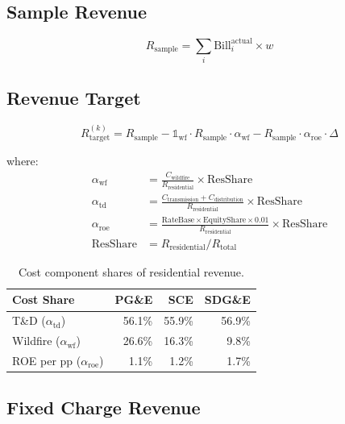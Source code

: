 \documentclass[9pt]{article}
\begin{document}
\subsection{Sample Revenue}

\begin{equation}
R_{\text{sample}} = \sum_i \text{Bill}_i^{\text{actual}} \times w
\end{equation}

\subsection{Revenue Target}

\begin{equation}
R_{\text{target}}^{(k)} = R_{\text{sample}} - \mathbb{1}_{\text{wf}} \cdot R_{\text{sample}} \cdot \alpha_{\text{wf}} - R_{\text{sample}} \cdot \alpha_{\text{roe}} \cdot \Delta
\end{equation}

where:
\begin{align}
\alpha_{\text{wf}} &= \frac{C_{\text{wildfire}}}{R_{\text{residential}}} \times \text{ResShare} \\
\alpha_{\text{td}} &= \frac{C_{\text{transmission}} + C_{\text{distribution}}}{R_{\text{residential}}} \times \text{ResShare} \\
\alpha_{\text{roe}} &= \frac{\text{RateBase} \times \text{EquityShare} \times 0.01}{R_{\text{residential}}} \times \text{ResShare} \\
\text{ResShare} &= R_{\text{residential}} / R_{\text{total}}
\end{align}

\begin{table}[htbp]
\centering
\caption{Cost component shares of residential revenue.}
\begin{tabular}{l r r r}
\toprule
\textbf{Cost Share} & \textbf{PG\&E} & \textbf{SCE} & \textbf{SDG\&E} \\
\midrule
T\&D ($\alpha_{\text{td}}$) & 56.1\% & 55.9\% & 56.9\% \\
Wildfire ($\alpha_{\text{wf}}$) & 26.6\% & 16.3\% & 9.8\% \\
ROE per pp ($\alpha_{\text{roe}}$) & 1.1\% & 1.2\% & 1.7\% \\
\bottomrule
\end{tabular}
\end{table}

\subsection{Fixed Charge Revenue}
\end{document}
